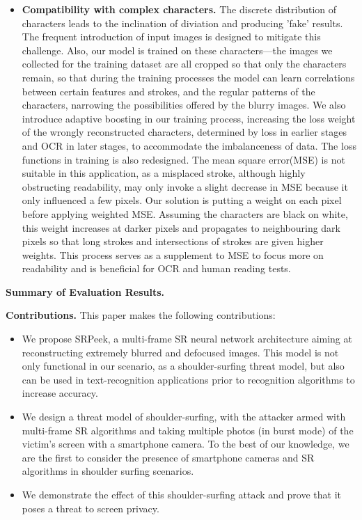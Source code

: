 \begin{itemize}[leftmargin=*]
  \item \textbf{Compatibility with complex characters.} The discrete distribution of characters leads to the inclination of diviation and producing 'fake' results. The frequent introduction of input images is designed to mitigate this challenge. Also, our model is trained on these characters---the images we collected for the training dataset are all cropped so that only the characters remain, so that during the training processes the model can learn correlations between certain features and strokes, and the regular patterns of the characters, narrowing the possibilities offered by the blurry images. We also introduce adaptive boosting\cite{adaboost} in our training process, increasing the loss weight of the wrongly reconstructed characters, determined by loss in earlier stages and OCR in later stages, to accommodate the imbalanceness of data. The loss functions in training is also redesigned. The mean square error(MSE) is not suitable in this application, as a misplaced stroke, although highly obstructing readability, may only invoke a slight decrease in MSE because it only influenced a few pixels. Our solution is putting a weight on each pixel before applying weighted MSE. Assuming the characters are black on white, this weight increases at darker pixels and propagates to neighbouring dark pixels so that long strokes and intersections of strokes are given higher weights. This process serves as a supplement to MSE to focus more on readability and is beneficial for OCR and human reading tests. 
\end{itemize}




\vspace{1mm}
\noindent
\textbf{Summary of Evaluation Results.}


\vspace{1mm}
\noindent
\textbf{Contributions.} This paper makes the following contributions:
\begin{itemize}[leftmargin=*]
  \item	We propose \textsf{SRPeek}, a multi-frame SR neural network architecture aiming at reconstructing extremely blurred and defocused images. This model is not only functional in our scenario, as a shoulder-surfing threat model, but also can be used in text-recognition applications prior to recognition algorithms to increase accuracy.
  \item	We design a threat model of shoulder-surfing, with the attacker armed with multi-frame SR algorithms and taking multiple photos (in burst mode) of the victim’s screen with a smartphone camera. To the best of our knowledge, we are the first to consider the presence of smartphone cameras and SR algorithms in shoulder surfing scenarios.
  \item	We demonstrate the effect of this shoulder-surfing attack and prove that it poses a threat to screen privacy.
\end{itemize}

